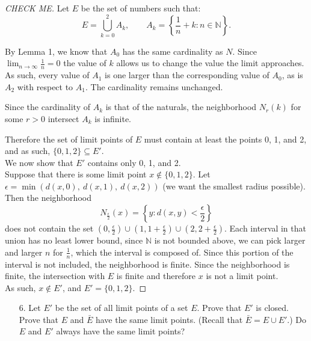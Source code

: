 \documentclass[10pt]{article}
\theoremstyle{definition}
\theoremstyle{plain}
\newcommand{\N}{\mathbb{N}}
\begin{document}
\begin{proof}[CHECK ME]
Let $E$ be the set of numbers such that:
$$E = \bigcup_{k=0}^{2} A_k, \qquad A_k = \left\{\frac{1}{n} + k: n\in\N\right\}.$$

By Lemma 1, we know that $A_0$ has the same cardinality as $N$. Since $\lim_{n\rightarrow\infty} \frac{1}{n} = 0$ the value of $k$ allows us to change the value the limit approaches. As such, every value of $A_1$ is one larger than the corresponding value of $A_0$, as is $A_2$ with respect to $A_1$. The cardinality remains unchanged.

Since the cardinality of $A_k$ is that of the naturals, the neighborhood $N_r(k)$ for some $r>0$ intersect $A_k$ is infinite.

Therefore the set of limit points of $E$ must contain at least the points 0, 1, and 2, and as such, $\{0,1,2\}\subseteq E'$. \\

We now show that $E'$ contains only 0, 1, and 2. \\

Suppose that there is some limit point $x\not\in\{0,1,2\}$. Let $\epsilon = \min(d(x,0),\ d(x,1),\ d(x,2))$ (we want the smallest radius possible). Then the neighborhood 
$$N_\frac{\epsilon}{2} (x) = \left\{y: d(x,y) < \frac{\epsilon}{2}\right\}$$
does not contain the set $(0, \frac{\epsilon}{2})\cup(1, 1+\frac{\epsilon}{2})\cup(2, 2+\frac{\epsilon}{2})$. Each interval in that union has no least lower bound, since $\N$ is not bounded above, we can pick larger and larger $n$ for $\frac{1}{n}$, which the interval is composed of. Since this portion of the interval is not included, the neighborhood is finite. Since the neighborhood is finite, the intersection with $E$ is finite and therefore $x$ is not a limit point. \\

As such, $x\not\in E'$, and $E' = \{0,1,2\}$.
\end{proof}



\pagebreak



\begin{enumerate}
\item[6.] Let $E'$ be the set of all limit points of a set $E$. Prove that $E'$ is closed. Prove that $E$ and $\bar{E}$ have the same limit points. (Recall that $\bar{E} = E \cup E'.$) Do $E$ and $E'$ always have the same limit points?
\end{enumerate}
\end{document}
